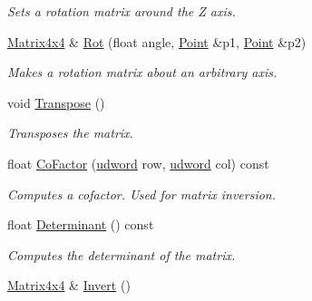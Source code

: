 \begin{DoxyCompactItemize}
\begin{DoxyCompactList}\small\item\em Sets a rotation matrix around the Z axis. \end{DoxyCompactList}\item 
\hypertarget{class_matrix4x4_a34cb9027eb16313063f06a45835715aa}{\hyperlink{class_matrix4x4}{Matrix4x4} \& \hyperlink{class_matrix4x4_a34cb9027eb16313063f06a45835715aa}{Rot} (float angle, \hyperlink{class_point}{Point} \&p1, \hyperlink{class_point}{Point} \&p2)}\label{class_matrix4x4_a34cb9027eb16313063f06a45835715aa}

\begin{DoxyCompactList}\small\item\em Makes a rotation matrix about an arbitrary axis. \end{DoxyCompactList}\item 
\hypertarget{class_matrix4x4_a8d34646055a4572f3504d1f07a21a89e}{void \hyperlink{class_matrix4x4_a8d34646055a4572f3504d1f07a21a89e}{Transpose} ()}\label{class_matrix4x4_a8d34646055a4572f3504d1f07a21a89e}

\begin{DoxyCompactList}\small\item\em Transposes the matrix. \end{DoxyCompactList}\item 
\hypertarget{class_matrix4x4_afc8239c94e440436630123a1ac2b24df}{float \hyperlink{class_matrix4x4_afc8239c94e440436630123a1ac2b24df}{Co\+Factor} (\hyperlink{_ice_types_8h_a44c6f1920ba5551225fb534f9d1a1733}{udword} row, \hyperlink{_ice_types_8h_a44c6f1920ba5551225fb534f9d1a1733}{udword} col) const }\label{class_matrix4x4_afc8239c94e440436630123a1ac2b24df}

\begin{DoxyCompactList}\small\item\em Computes a cofactor. Used for matrix inversion. \end{DoxyCompactList}\item 
\hypertarget{class_matrix4x4_a0c106185086895c738f6dd356096df64}{float \hyperlink{class_matrix4x4_a0c106185086895c738f6dd356096df64}{Determinant} () const }\label{class_matrix4x4_a0c106185086895c738f6dd356096df64}

\begin{DoxyCompactList}\small\item\em Computes the determinant of the matrix. \end{DoxyCompactList}\item 
\hypertarget{class_matrix4x4_a23dc21fb54841388b54649bb9affd81c}{\hyperlink{class_matrix4x4}{Matrix4x4} \& \hyperlink{class_matrix4x4_a23dc21fb54841388b54649bb9affd81c}{Invert} ()}\label{class_matrix4x4_a23dc21fb54841388b54649bb9affd81c}


\end{DoxyCompactItemize}
